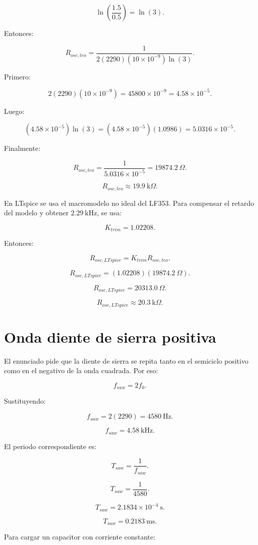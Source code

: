 \documentclass[11pt,letterpaper]{article}
\begin{document}
\[
\ln\left(\frac{1.5}{0.5}\right)=\ln(3).
\]

Entonces:

\[
R_{osc,teo}=
\frac{1}
{2(2290)(10\times 10^{-9})\ln(3)}.
\]

Primero:

\[
2(2290)(10\times 10^{-9})
=45800\times 10^{-9}
=4.58\times 10^{-5}.
\]

Luego:

\[
(4.58\times 10^{-5})\ln(3)
=(4.58\times 10^{-5})(1.0986)
=5.0316\times 10^{-5}.
\]

Finalmente:

\[
R_{osc,teo}
=
\frac{1}{5.0316\times 10^{-5}}
=19874.2~\Omega.
\]

\[
R_{osc,teo}\approx 19.9~\text{k}\Omega.
\]

En LTspice se usa el macromodelo no ideal del LF353. Para compensar el retardo
del modelo y obtener \(2.29~\text{kHz}\), se usa:

\[
K_{trim}=1.02208.
\]

Entonces:

\[
R_{osc,LTspice}=K_{trim}R_{osc,teo}.
\]

\[
R_{osc,LTspice}=(1.02208)(19874.2~\Omega).
\]

\[
R_{osc,LTspice}=20313.0~\Omega.
\]

\[
\boxed{R_{osc,LTspice}\approx 20.3~\text{k}\Omega}.
\]

\section{Onda diente de sierra positiva}

El enunciado pide que la diente de sierra se repita tanto en el semiciclo
positivo como en el negativo de la onda cuadrada. Por eso:

\[
f_{saw}=2f_0.
\]

Sustituyendo:

\[
f_{saw}=2(2290)=4580~\text{Hz}.
\]

\[
\boxed{f_{saw}=4.58~\text{kHz}}.
\]

El periodo correspondiente es:

\[
T_{saw}=\frac{1}{f_{saw}}.
\]

\[
T_{saw}=\frac{1}{4580}.
\]

\[
T_{saw}=2.1834\times 10^{-4}~\text{s}.
\]

\[
T_{saw}=0.2183~\text{ms}.
\]

Para cargar un capacitor con corriente constante:
\end{document}
